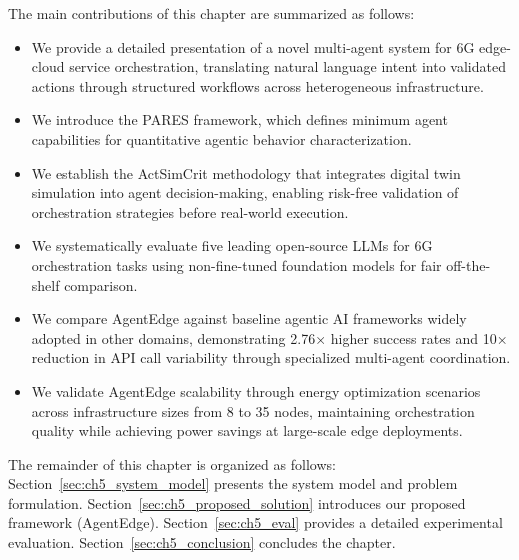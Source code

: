 The main contributions of this chapter are summarized as follows:
\begin{itemize}
    \item We provide a detailed presentation of a novel multi-agent system for \ac{6G} edge-cloud service orchestration, translating natural language intent into validated actions through structured workflows across heterogeneous infrastructure.

    \item We introduce the \ac{PARES} framework, which defines minimum agent capabilities for quantitative agentic behavior characterization.

    \item We establish the \ac{ActSimCrit} methodology that integrates digital twin simulation into agent decision-making, enabling risk-free validation of orchestration strategies before real-world execution.

    \item We systematically evaluate five leading open-source \acp{LLM} for \ac{6G} orchestration tasks using non-fine-tuned foundation models for fair off-the-shelf comparison.

    \item We compare \ac{AgentEdge} against baseline agentic AI frameworks widely adopted in other domains, demonstrating 2.76× higher success rates and 10× reduction in \ac{API} call variability through specialized multi-agent coordination.
    
    \item We validate \ac{AgentEdge} scalability through energy optimization scenarios across infrastructure sizes from 8 to 35 nodes, maintaining orchestration quality while achieving power savings at large-scale edge deployments.
\end{itemize}

The remainder of this chapter is organized as follows: Section~\ref{sec:ch5_system_model} presents the system model and problem formulation. Section~\ref{sec:ch5_proposed_solution} introduces our proposed framework (\ac{AgentEdge}). Section~\ref{sec:ch5_eval} provides a detailed experimental evaluation. Section~\ref{sec:ch5_conclusion} concludes the chapter.
